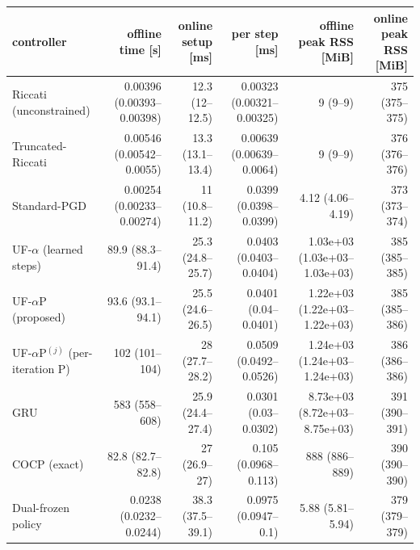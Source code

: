 \begin{tabular}{lrrrrr}
\toprule
controller & offline time [s] & online setup [ms] & per step [ms] & offline peak RSS [MiB] & online peak RSS [MiB] \\
\midrule
Riccati (unconstrained) & 0.00396 (0.00393--0.00398) & 12.3 (12--12.5) & 0.00323 (0.00321--0.00325) & 9 (9--9) & 375 (375--375) \\
Truncated-Riccati & 0.00546 (0.00542--0.0055) & 13.3 (13.1--13.4) & 0.00639 (0.00639--0.0064) & 9 (9--9) & 376 (376--376) \\
Standard-PGD & 0.00254 (0.00233--0.00274) & 11 (10.8--11.2) & 0.0399 (0.0398--0.0399) & 4.12 (4.06--4.19) & 373 (373--374) \\
UF-$\alpha$ (learned steps) & 89.9 (88.3--91.4) & 25.3 (24.8--25.7) & 0.0403 (0.0403--0.0404) & 1.03e+03 (1.03e+03--1.03e+03) & 385 (385--385) \\
UF-$\alpha$P (proposed) & 93.6 (93.1--94.1) & 25.5 (24.6--26.5) & 0.0401 (0.04--0.0401) & 1.22e+03 (1.22e+03--1.22e+03) & 385 (385--386) \\
UF-$\alpha$P$^{(j)}$ (per-iteration P) & 102 (101--104) & 28 (27.7--28.2) & 0.0509 (0.0492--0.0526) & 1.24e+03 (1.24e+03--1.24e+03) & 386 (386--386) \\
GRU & 583 (558--608) & 25.9 (24.4--27.4) & 0.0301 (0.03--0.0302) & 8.73e+03 (8.72e+03--8.75e+03) & 391 (390--391) \\
COCP (exact) & 82.8 (82.7--82.8) & 27 (26.9--27) & 0.105 (0.0968--0.113) & 888 (886--889) & 390 (390--390) \\
Dual-frozen policy & 0.0238 (0.0232--0.0244) & 38.3 (37.5--39.1) & 0.0975 (0.0947--0.1) & 5.88 (5.81--5.94) & 379 (379--379) \\
\bottomrule
\end{tabular}
